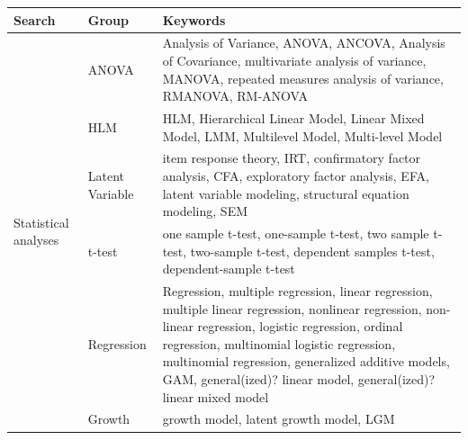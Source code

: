 \documentclass[
  english,
  ,man]{apa7}
\begin{document}
\begin{table}
\label{tab:searchwords}
\begin{tabularx}{\linewidth}{llX}

\toprule
Search & Group & Keywords \\
\midrule 

\multirow{7}{*}{Statistical analyses} & ANOVA           & Analysis of Variance, ANOVA, ANCOVA, Analysis of Covariance, multivariate analysis of variance, MANOVA, repeated measures analysis of variance, RMANOVA, RM-ANOVA                                                                                                                                                               \\
                                    & HLM             & HLM, Hierarchical Linear Model, Linear Mixed Model, LMM, Multilevel Model, Multi-level Model                                                                                                                                                                                                                                    \\
                                    & Latent Variable & item response theory, IRT, confirmatory factor analysis, CFA, exploratory factor analysis, EFA, latent variable modeling, structural equation modeling, SEM                                                                                                                                                                     \\
                                    & t-test          & one sample t-test, one-sample t-test, two sample t-test, two-sample t-test, dependent samples t-test, dependent-sample t-test                                                                                                                                                                                                   \\
                                    & Regression      & Regression, multiple regression, linear regression, multiple linear regression, nonlinear regression, non-linear regression, logistic regression, ordinal regression, multinomial logistic regression, multinomial regression, generalized additive models, GAM, general(ized)? linear model, general(ized)? linear mixed model \\
                                    & Growth          & growth model, latent growth model, LGM                                                                                                                                                                                                                                                                                          \\

\end{tabularx}
\end{table}
\end{document}
